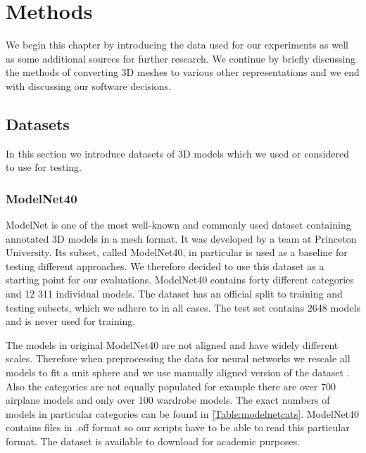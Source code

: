 \chapter{Methods}
\label{sec:chap4}
We begin this chapter by introducing the data used for our experiments as well as some additional sources for further research. We continue by briefly discussing the methods of converting 3D meshes to various other representations and we end with discussing our software decisions.

\section{Datasets}
\label{sec:dataset}
In this section we introduce datasets of 3D models which we used or considered to use for testing.

\subsection{ModelNet40}
ModelNet \cite{wu_3d_2014} is one of the most well-known and commonly used dataset containing annotated 3D models in a mesh format. It was developed by a team at Princeton University. Its subset, called ModelNet40, in particular is used as a baseline for testing different approaches. We therefore decided to use this dataset as a starting point for our evaluations. ModelNet40 contains forty different categories and 12 311 individual models. The dataset has an official split to training and testing subsets, which we adhere to in all cases. The test set contains 2648 models and is never used for training. \par
The models in original ModelNet40 are not aligned and have widely different scales. Therefore when preprocessing the data for neural networks we rescale all models to fit a  unit sphere and we use manually aligned version of the dataset \cite{sedaghat_orientation-boosted_2016}. Also the categories are not equally populated for example there are over 700 airplane models and only over 100 wardrobe models. The exact numbers of models in particular categories can be found in \autoref{Table:modelnetcats}. ModelNet40 contains files in .off format so our scripts have to be able to read this particular format. The dataset is available to download for academic purposes.




